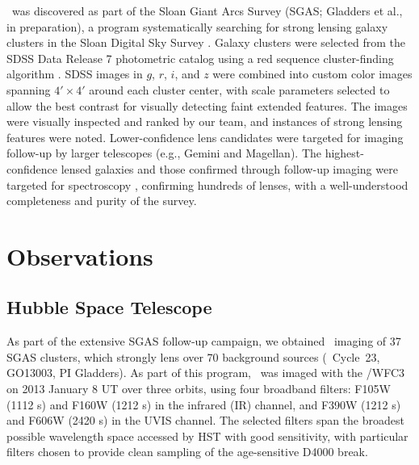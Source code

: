 \giantarc\ was discovered as part of the Sloan Giant Arcs Survey (SGAS; Gladders et al., in preparation), a program systematically searching for strong lensing galaxy clusters in the Sloan Digital Sky Survey \citep[SDSS; ][]{York:2000sp}. Galaxy clusters were selected from the SDSS Data Release 7 photometric catalog using a red sequence cluster-finding algorithm \citep[e.g.,][]{Gladders:2000kq}. SDSS images in $g$, $r$, $i$, and $z$ were combined into custom color images spanning $4'\times4'$ around each cluster center, with scale parameters selected to allow the best contrast for visually detecting faint extended features. The images were visually inspected and ranked by our team, and instances of strong lensing features were noted. Lower-confidence lens candidates were targeted for imaging follow-up by larger telescopes (e.g., Gemini and Magellan). The highest-confidence lensed galaxies and those confirmed through follow-up imaging were targeted for spectroscopy \citep{Bayliss:2011ul,Bayliss:2011gf,Bayliss:2012rt}, confirming hundreds of lenses, with a well-understood completeness and purity of the survey.  

\section{Observations}
\label{chap4:sec:observations}

\subsection{Hubble Space Telescope}
As part of the extensive SGAS follow-up campaign, we obtained \hst\ imaging of 37 SGAS clusters, which strongly lens over 70 background sources (\hst\ Cycle~23, GO13003, PI Gladders). As part of this program, \cluster\ was imaged with the \hst/WFC3 on 2013 January 8 UT over three orbits, using four broadband filters: F105W (1112 s) and F160W (1212 s) in the infrared (IR) channel, and F390W  (1212 s) and F606W (2420 s) in the UVIS channel. The selected filters span the broadest possible wavelength space accessed by HST with good sensitivity, with particular filters chosen to provide clean sampling of the age-sensitive D4000 break. 

